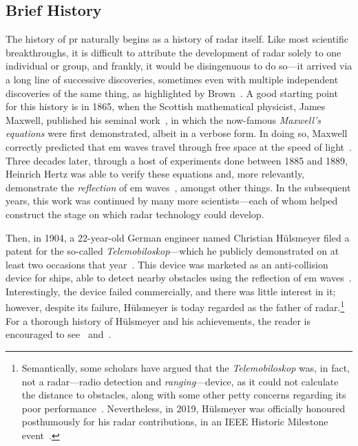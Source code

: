 \documentclass[class=report,11pt,crop=false]{standalone}
\begin{document}
\subsection{Brief History}
The history of \gls{pr} naturally begins as a history of radar itself. Like most scientific breakthroughs, it is difficult to attribute the development of radar solely to one individual or group, and frankly, it would be disingenuous to do so---it arrived via a long line of successive discoveries, sometimes even with multiple independent discoveries of the same thing, as highlighted by Brown~\cite{brown1999technical}. A good starting point for this history is in 1865, when the Scottish mathematical physicist, James Maxwell, published his seminal work~\cite{maxwell1865viii}, in which the now-famous \emph{Maxwell's equations} were first demonstrated, albeit in a verbose form. In doing so, Maxwell correctly predicted that \Gls{em} waves travel through free space at the speed of light~\cite{Sengupta2003}. Three decades later, through a host of experiments done between 1885 and 1889, Heinrich Hertz was able to verify these equations and, more relevantly, demonstrate the \emph{reflection} of \gls{em} waves~\cite{hertz1893electromagnetic, Cichon1995}, amongst other things. In the subsequent years, this work was continued by many more scientists---each of whom helped construct the stage on which radar technology could develop.

Then, in 1904, a 22-year-old German engineer named Christian H\"ulsmeyer filed a patent for the so-called \emph{Telemobiloskop}---which he publicly demonstrated on at least two occasions that year~\cite{Galati2014}. This device was marketed as an anti-collision device for ships, able to detect nearby obstacles using the reflection of \gls{em} waves~\cite{swords1986technical}. Interestingly, the device failed commercially, and there was little interest in it; however, despite its failure, H\"ulsmeyer is today regarded as the father of radar.\footnote{Semantically, some scholars have argued that the \emph{Telemobiloskop} was, in fact, not a \acrshort{radar}---radio detection and \emph{ranging}---device, as it could not calculate the distance to obstacles, along with some other petty concerns regarding its poor performance~\cite{pritchard1989radar}. Nevertheless, in 2019, H\"ulsmeyer was officially honoured posthumously for his radar contributions, in an IEEE Historic Milestone event~\cite{Griffiths2019}.} For a thorough history of H\"ulsmeyer and his achievements, the reader is encouraged to see~\cite{pritchard1989radar} and~\cite{bauer2005christian}.
\end{document}

